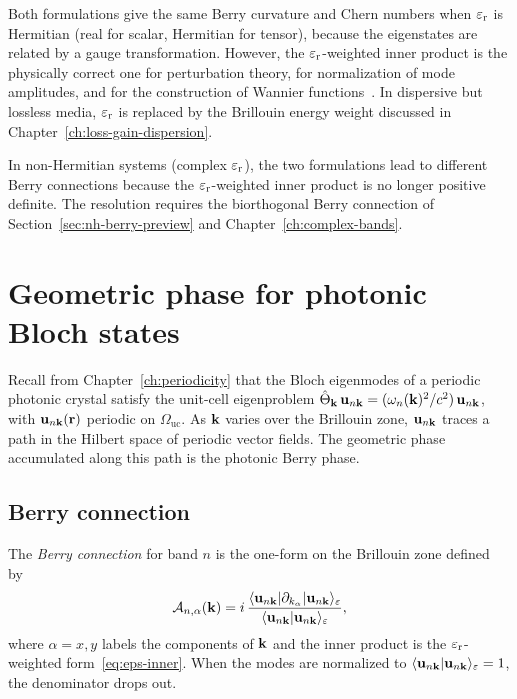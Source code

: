 Both formulations give the same Berry curvature and Chern numbers when
$\varepsilon_{\mathrm{r}}$ is Hermitian (real for scalar, Hermitian for tensor), because
the eigenstates are related by a gauge transformation. However, the
$\varepsilon_{\mathrm{r}}$-weighted inner product is the physically correct one for
perturbation theory, for normalization of mode amplitudes, and for the
construction of Wannier functions~\cite{paz2019tutorial}. In dispersive
but lossless media, $\varepsilon_{\mathrm{r}}$ is replaced by the Brillouin energy weight
discussed in Chapter~\ref{ch:loss-gain-dispersion}.

\begin{remark}
In non-Hermitian systems (complex $\varepsilon_{\mathrm{r}}$), the two formulations lead
to different Berry connections because the $\varepsilon_{\mathrm{r}}$-weighted inner
product is no longer positive definite. The resolution requires the
biorthogonal Berry connection of Section~\ref{sec:nh-berry-preview} and
Chapter~\ref{ch:complex-bands}.
\end{remark}


\section{Geometric phase for photonic Bloch states}
\label{sec:berry-photonic}

Recall from Chapter~\ref{ch:periodicity} that the Bloch eigenmodes of a
periodic photonic crystal satisfy the unit-cell eigenproblem
$\hat{\Theta}_{\mathbf{k}}\,\mathbf{u}_{n\mathbf{k}} = (\omega_n(\mathbf{k})^2/c^2)\,\mathbf{u}_{n\mathbf{k}}$,
with $\mathbf{u}_{n\mathbf{k}}(\mathbf{r})$ periodic on $\Omega_{\mathrm{uc}}$.
As $\mathbf{k}$ varies over the Brillouin zone, $\mathbf{u}_{n\mathbf{k}}$ traces a
path in the Hilbert space of periodic vector fields. The geometric phase
accumulated along this path is the photonic Berry phase.

\subsection{Berry connection}
\label{ssec:berry-connection}

The \emph{Berry connection} for band $n$ is the one-form on the
Brillouin zone defined by~\cite{paz2019tutorial}
\begin{equation}
 \mathcal{A}_{n,\alpha}(\mathbf{k}) = i\,
 \frac{\langle\mathbf{u}_{n\mathbf{k}}|\partial_{k_\alpha}|\mathbf{u}_{n\mathbf{k}}\rangle_\varepsilon}
 {\langle\mathbf{u}_{n\mathbf{k}}|\mathbf{u}_{n\mathbf{k}}\rangle_\varepsilon},
 \label{eq:berry-connection}
\end{equation}
where $\alpha = x, y$ labels the components of $\mathbf{k}$ and the inner
product is the $\varepsilon_{\mathrm{r}}$-weighted form~\eqref{eq:eps-inner}. When the
modes are normalized to
$\langle\mathbf{u}_{n\mathbf{k}}|\mathbf{u}_{n\mathbf{k}}\rangle_\varepsilon = 1$,
the denominator drops out.

